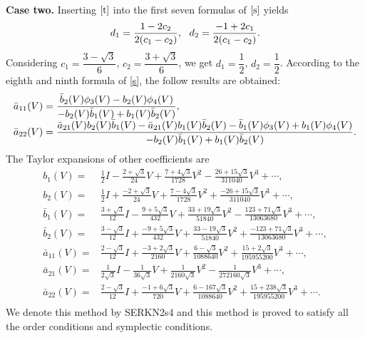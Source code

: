\documentclass{article}
\begin{document}
\textbf{Case two.} Inserting  $\eqref{t}$ into the first seven
formulas of $\eqref{s}$ yields
\begin{equation*}
\begin{array}
[c]{ll} d_{1}=\dfrac{1-2c_{2}}{2(c_{1}-c_{2})},\ \
 d_{2}=\dfrac{-1+2c_{1}}{2(c_{1}-c_{2})}.
\end{array}
\label{ppmn}%
\end{equation*}
Considering $c_{1}=\dfrac{3-\sqrt{3}}{6}$,
$c_{2}=\dfrac{3+\sqrt{3}}{6}$, we get $d_{1}=\dfrac{1}{2}$,
$d_{2}=\dfrac{1}{2}$. According to the eighth and ninth formula of
\eqref{s}, the follow results are obtained:
\begin{equation*}
\begin{array}
[c]{ll}
\bar{a}_{11}(V)=\dfrac{\bar{b}_{2}(V)\phi_{3}(V)-b_{2}(V)\phi_{4}(V)}{-b_{2}(V)\bar{b}_{1}(V)+b_{1}(V)\bar{b}_{2}(V)},\\
\bar{a}_{22}(V)=\dfrac{\bar{a}_{21}(V)b_{2}(V)\bar{b}_{1}(V)-\bar{a}_{21}(V)b_{1}(V)\bar{b}_{2}(V)-
\bar{b}_{1}(V)\phi_{3}(V)+b_{1}(V)\phi_{4}(V)}{-b_{2}(V)\bar{b}_{1}(V)+b_{1}(V)\bar{b}_{2}(V)}.
\end{array}
\label{ppmn}%
\end{equation*}
The Taylor expansions of other coefficients are
\begin{equation}
\begin{aligned}
b_1(V)=&\frac{1}{2}I -\frac{2+\sqrt{3}}{24} V +
\frac{7+4\sqrt{3}}{1728} V^2 -\frac{26+15\sqrt{3}}{311040} V^3 +
\cdots
,\\
b_2(V)=&\frac{1}{2}I + \frac{-2+\sqrt{3}}{24}V +
\frac{7-4\sqrt{3}}{1728} V^2 + \frac{-26+15\sqrt{3}}{311040} V^3
+\cdots ,
\\
 \bar{b}_1(V)=&
 \frac{3+\sqrt{3}}{12}I -\frac{9+5\sqrt{3}}{432}
  V + \frac{33+19\sqrt{3}}{51840}V^2 -\frac{123+71\sqrt{3}}{13063680}
  V^3  +\cdots
,\\
 \bar{b}_2(V)=&
 \frac{3-\sqrt{3}}{12}I  +\frac{-9+5\sqrt{3}}{432}
  V + \frac{33-19\sqrt{3}}{51840} V^2 + \frac{-123+71\sqrt{3}}{13063680}
  V^3 +\cdots
,\\
\bar{a}_{11}(V)=& \frac{2-\sqrt{3}}{12}I +\frac{-3+2\sqrt{3}}{2160}V
+ \frac{6-\sqrt{3}}{1088640}V^2  +\frac{15+2\sqrt{3}}{195955200}V^3
+\cdots
,\\
\bar{a}_{21}(V)=& \frac{1}{2\sqrt{3}}I -\frac{1}{36\sqrt{3}}V +
\frac{1}{2160\sqrt{3}}V^2 -\frac{1}{272160\sqrt{3}}V^3  +\cdots
,\\
\bar{a}_{22}(V)=& \frac{2-\sqrt{3}}{12}I +\frac{-1+6\sqrt{3}}{720}V
+ \frac{6-167\sqrt{3}}{1088640} V^2  +
\frac{15+238\sqrt{3}}{195955200}V^3 +\cdots
.\\
\end{aligned}
\end{equation}
We denote this method by SERKN2s4 and this method is proved to
satisfy all the order conditions and symplectic conditions.
\end{document}
